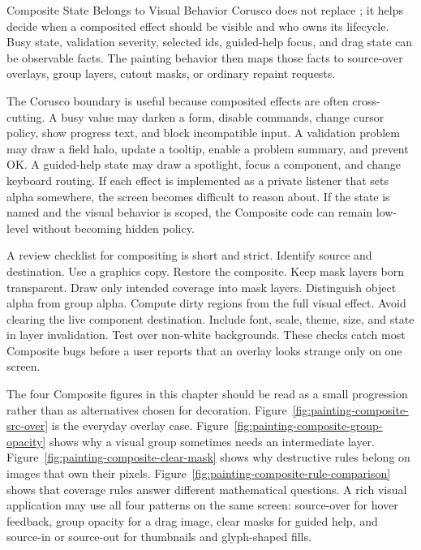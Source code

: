 \begin{coruscobox}{Composite State Belongs to Visual Behavior}
Corusco does not replace ; it helps decide when a composited effect should be visible and who owns its lifecycle. Busy state, validation severity, selected ids, guided-help focus, and drag state can be observable facts. The painting behavior then maps those facts to source-over overlays, group layers, cutout masks, or ordinary repaint requests.
\end{coruscobox}

The Corusco boundary is useful because composited effects are often cross-cutting. A busy value may darken a form, disable commands, change cursor policy, show progress text, and block incompatible input. A validation problem may draw a field halo, update a tooltip, enable a problem summary, and prevent OK. A guided-help state may draw a spotlight, focus a component, and change keyboard routing. If each effect is implemented as a private listener that sets alpha somewhere, the screen becomes difficult to reason about. If the state is named and the visual behavior is scoped, the Composite code can remain low-level without becoming hidden policy.

A review checklist for compositing is short and strict. Identify source and destination. Use a graphics copy. Restore the composite. Keep mask layers born transparent. Draw only intended coverage into mask layers. Distinguish object alpha from group alpha. Compute dirty regions from the full visual effect. Avoid clearing the live component destination. Include font, scale, theme, size, and state in layer invalidation. Test over non-white backgrounds. These checks catch most Composite bugs before a user reports that an overlay looks strange only on one screen.

The four Composite figures in this chapter should be read as a small progression rather than as alternatives chosen for decoration. Figure~\ref{fig:painting-composite-src-over} is the everyday overlay case. Figure~\ref{fig:painting-composite-group-opacity} shows why a visual group sometimes needs an intermediate layer. Figure~\ref{fig:painting-composite-clear-mask} shows why destructive rules belong on images that own their pixels. Figure~\ref{fig:painting-composite-rule-comparison} shows that coverage rules answer different mathematical questions. A rich visual application may use all four patterns on the same screen: source-over for hover feedback, group opacity for a drag image, clear masks for guided help, and source-in or source-out for thumbnails and glyph-shaped fills.

